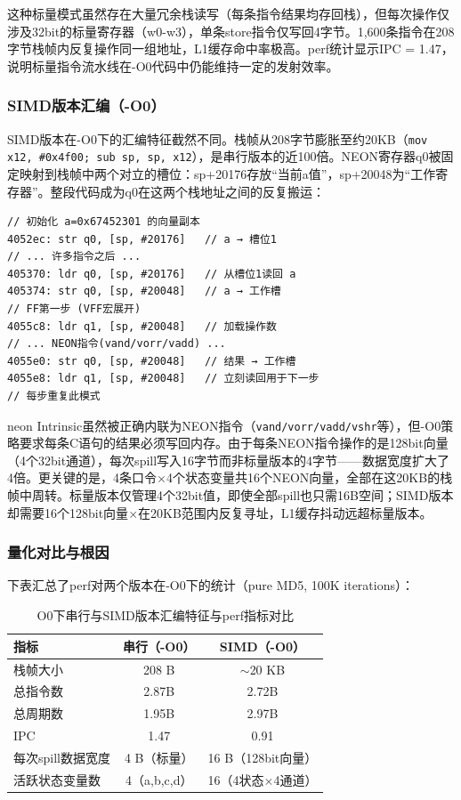 \documentclass[UTF8,a4paper,10pt]{ctexart}
\begin{document}
这种标量模式虽然存在大量冗余栈读写（每条指令结果均存回栈），但每次操作仅涉及32bit的标量寄存器（w0-w3），单条store指令仅写回4字节。1,600条指令在208字节栈帧内反复操作同一组地址，L1缓存命中率极高。perf统计显示IPC = 1.47，说明标量指令流水线在-O0代码中仍能维持一定的发射效率。

\subsubsection{SIMD版本汇编（-O0）}

SIMD版本在-O0下的汇编特征截然不同。栈帧从208字节膨胀至约20KB（\lstinline{mov x12, #0x4f00; sub sp, sp, x12}），是串行版本的近100倍。NEON寄存器q0被固定映射到栈帧中两个对立的槽位：sp+20176存放“当前a值”，sp+20048为“工作寄存器”。整段代码成为q0在这两个栈地址之间的反复搬运：

\begin{lstlisting}[language={},basicstyle=\ttfamily\small,columns=flexible,aboveskip=4pt,belowskip=4pt]
// 初始化 a=0x67452301 的向量副本
4052ec: str q0, [sp, #20176]   // a → 槽位1
// ... 许多指令之后 ...
405370: ldr q0, [sp, #20176]   // 从槽位1读回 a
405374: str q0, [sp, #20048]   // a → 工作槽
// FF第一步 (VFF宏展开)
4055c8: ldr q1, [sp, #20048]   // 加载操作数
// ... NEON指令(vand/vorr/vadd) ...
4055e0: str q0, [sp, #20048]   // 结果 → 工作槽
4055e8: ldr q1, [sp, #20048]   // 立刻读回用于下一步
// 每步重复此模式
\end{lstlisting}

neon Intrinsic虽然被正确内联为NEON指令（\lstinline{vand/vorr/vadd/vshr}等），但-O0策略要求每条C语句的结果必须写回内存。由于每条NEON指令操作的是128bit向量（4个32bit通道），每次spill写入16字节而非标量版本的4字节——数据宽度扩大了4倍。更关键的是，4条口令$\times$4个状态变量共16个NEON向量，全部在这20KB的栈帧中周转。标量版本仅管理4个32bit值，即使全部spill也只需16B空间；SIMD版本却需要16个128bit向量$\times$在20KB范围内反复寻址，L1缓存抖动远超标量版本。

\subsubsection{量化对比与根因}

下表汇总了perf对两个版本在-O0下的统计（pure MD5, 100K iterations）：

\begin{table}[ht]
\centering
\caption{O0下串行与SIMD版本汇编特征与perf指标对比}
\label{tab:o0-asm}
\begin{tabular}{lcc}
\hline
\textbf{指标} & \textbf{串行（-O0）} & \textbf{SIMD（-O0）} \\
\hline
栈帧大小 & 208 B & $\sim$20 KB \\
总指令数 & 2.87B & 2.72B \\
总周期数 & 1.95B & 2.97B \\
IPC & 1.47 & 0.91 \\
每次spill数据宽度 & 4 B（标量） & 16 B（128bit向量） \\
活跃状态变量数 & 4（a,b,c,d） & 16（4状态$\times$4通道） \\
\hline
\end{tabular}
\end{table}
\end{document}
